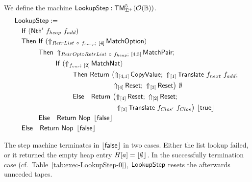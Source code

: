 \begin{definition}[$\MS{LookupStep}$]
  \label{def:Lookup_Step}
  We define the machine $\mathsf{LookupStep} : \mathsf{TM}_{\Sigma^+}^5(\mathcal{O}(\mathbb{B}))$.
  \begin{align*}
    & \MS{LookupStep} := \\
    & \quad \MS{If}~(\MS{Nth'}~f_{heap}~f_{add}) \\
    & \quad \MS{Then}~\MS{If}~(\LiftBoth{\MS{MatchOption}}{RetrList ~\circ~ f_{heap}}{\Vector{4}}) \\
    & \quad \phantom{\MS{Then}}~\MS{Then}~\LiftBoth{\MS{MatchPair}}{RetrOpt \circ RetrList ~\circ~ f_{heap}}{\Vector{4;3}} \Seq \\
    & \quad \phantom{\MS{Then}~\MS{Then}}~\MS{If}~(\LiftBoth{\MS{MatchNat}}{f_{var}}{\Vector{2}}) \\
    & \quad \phantom{\MS{Then}~\MS{Then}~\MS{Then}}~\MS{Then}~ \MS{Return}~\bigl(
      \LiftTapes{\MS{CopyValue}}{\Vector{4;1}} \Seq
      \LiftTapes{\MS{Translate}~f_{next}~f_{add}}{\Vector{1}} \Seq \\
    & \quad \phantom{\MS{Then}~\MS{Then}~\MS{Then}~\MS{Then}~\MS{Return}\bigl(}
      \LiftTapes{\MS{Reset}}{\Vector{4}} \Seq
      \LiftTapes{\MS{Reset}}{\Vector{3}}
      \bigr)~{\None} \\
    & \quad \phantom{\MS{Then}~\MS{Then}~\MS{Then}}~\MS{Else}~~~ \MS{Return}~\bigl(
      \LiftTapes{\MS{Reset}}{\Vector{4}} \Seq
      \LiftTapes{\MS{Reset}}{\Vector{2}} \Seq \\
    & \quad \phantom{\phantom{\MS{Then}~\MS{Then}~\MS{Then}}~\MS{Else}~~~ \MS{Return}~\bigl(}
      \LiftTapes{\MS{Translate}~f_{Clos'}~f_{Clos}}{\Vector{3}}
      \bigr)~{\Some\true} \\
    & \quad \phantom{\MS{Then}}~\MS{Else}~~~ \Return{\Nop}{\Some\false} \\
    & \quad \MS{Else}~~~ \Return{\Nop}{\Some\false}
  \end{align*}
\end{definition}

The step machine terminates in $\left\lfloor {\ensuremath{\mathsf{false}}} \right\rfloor$ in two cases.  Either the list lookup failed, or it returned the empty heap entry $H[a]=\left\lfloor {\emptyset} \right\rfloor$.  In
the successfully termination case (cf.\ Table~\ref{tab:exec-LookupStep-0}), $\MS{LookupStep}$ resets the afterwards unneeded tapes.


